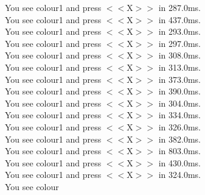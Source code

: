 \documentclass[pdflatex,sn-nature]{sn-jnl}%
\theoremstyle{thmstyleone}%
\theoremstyle{thmstyletwo}%
\theoremstyle{thmstylethree}%
\begin{document}
You see colour1 and press $<<$X$>>$ in 287.0ms. $~$\\ 
You see colour1 and press $<<$X$>>$ in 437.0ms. $~$\\ 
You see colour1 and press $<<$X$>>$ in 293.0ms. $~$\\ 
You see colour1 and press $<<$X$>>$ in 297.0ms. $~$\\ 
You see colour1 and press $<<$X$>>$ in 308.0ms. $~$\\ 
You see colour1 and press $<<$X$>>$ in 313.0ms. $~$\\ 
You see colour1 and press $<<$X$>>$ in 373.0ms. $~$\\ 
You see colour1 and press $<<$X$>>$ in 390.0ms. $~$\\ 
You see colour1 and press $<<$X$>>$ in 304.0ms. $~$\\ 
You see colour1 and press $<<$X$>>$ in 334.0ms. $~$\\ 
You see colour1 and press $<<$X$>>$ in 326.0ms. $~$\\ 
You see colour1 and press $<<$X$>>$ in 382.0ms. $~$\\ 
You see colour1 and press $<<$X$>>$ in 803.0ms. $~$\\ 
You see colour1 and press $<<$X$>>$ in 430.0ms. $~$\\ 
You see colour1 and press $<<$X$>>$ in 324.0ms. $~$\\ 
You see colour
\end{document}
